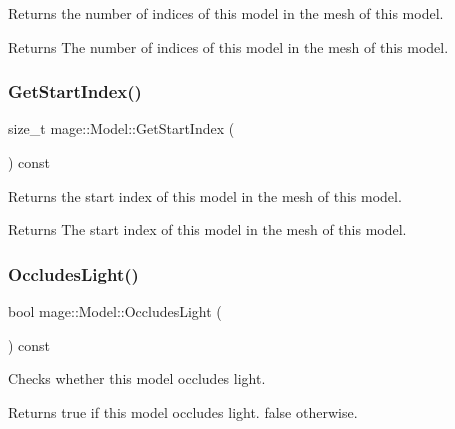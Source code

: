 Returns the number of indices of this model in the mesh of this model.

\begin{DoxyReturn}{Returns}
The number of indices of this model in the mesh of this model. 
\end{DoxyReturn}
\hypertarget{classmage_1_1_model_a876fcfe369f12e2d7edb6b533dd06252}{}\label{classmage_1_1_model_a876fcfe369f12e2d7edb6b533dd06252} 
\subsubsection{\texorpdfstring{Get\+Start\+Index()}{GetStartIndex()}}
{\footnotesize\ttfamily size\+\_\+t mage\+::\+Model\+::\+Get\+Start\+Index (\begin{DoxyParamCaption}{ }\end{DoxyParamCaption}) const\hspace{0.3cm}{\ttfamily [noexcept]}}

Returns the start index of this model in the mesh of this model.

\begin{DoxyReturn}{Returns}
The start index of this model in the mesh of this model. 
\end{DoxyReturn}
\hypertarget{classmage_1_1_model_a2ab5542819b80d58f349128a6c0194b5}{}\label{classmage_1_1_model_a2ab5542819b80d58f349128a6c0194b5} 
\subsubsection{\texorpdfstring{Occludes\+Light()}{OccludesLight()}}
{\footnotesize\ttfamily bool mage\+::\+Model\+::\+Occludes\+Light (\begin{DoxyParamCaption}{ }\end{DoxyParamCaption}) const\hspace{0.3cm}{\ttfamily [noexcept]}}

Checks whether this model occludes light.

\begin{DoxyReturn}{Returns}
{\ttfamily true} if this model occludes light. {\ttfamily false} otherwise. 
\end{DoxyReturn}
\hypertarget{classmage_1_1_model_a563515c64ec39cfcda9f6ca37576391b}{}\label{classmage_1_1_model_a563515c64ec39cfcda9f6ca37576391b} 
